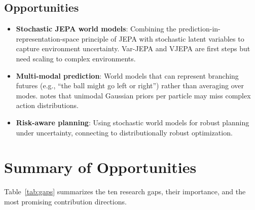 \documentclass[11pt,a4paper]{article}
\begin{document}
\subsection{Opportunities}
\begin{itemize}[noitemsep]
    \item \textbf{Stochastic JEPA world models}: Combining the prediction-in-representation-space principle of JEPA with stochastic latent variables to capture environment uncertainty. Var-JEPA \citep{gogl2026varjepa} and VJEPA \citep{huang2026vjepa} are first steps but need scaling to complex environments.
    \item \textbf{Multi-modal prediction}: World models that can represent branching futures (e.g., ``the ball might go left or right'') rather than averaging over modes. \citet{daniel2026lpwm} notes that unimodal Gaussian priors per particle may miss complex action distributions.
    \item \textbf{Risk-aware planning}: Using stochastic world models for robust planning under uncertainty, connecting to distributionally robust optimization.
\end{itemize}

\section{Summary of Opportunities}

Table~\ref{tab:gaps} summarizes the ten research gaps, their importance, and the most promising contribution directions.
\end{document}
